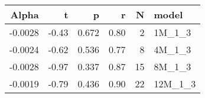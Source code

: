 \begin{table}[ht]
\centering
\begin{tabular}{rrrrrl}
  \hline
Alpha & t & p & r & N & model \\ 
  \hline
-0.0028 & -0.43 & 0.672 & 0.80 & 2 & 1M\_1\_3 \\ 
  -0.0024 & -0.62 & 0.536 & 0.77 & 8 & 4M\_1\_3 \\ 
  -0.0028 & -0.97 & 0.337 & 0.87 & 15 & 8M\_1\_3 \\ 
  -0.0019 & -0.79 & 0.436 & 0.90 & 22 & 12M\_1\_3 \\ 
   \hline
\end{tabular}
\end{table}

